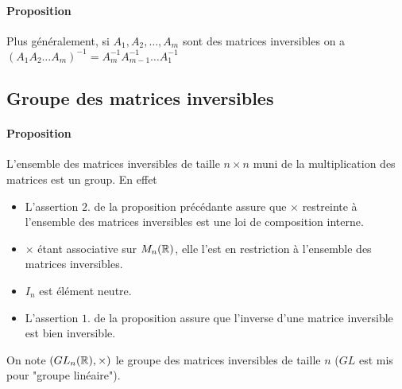 \paragraph{Proposition} Plus généralement, si $A_1, A_2, \ldots, A_m$ sont des matrices inversibles on a $(A_1 A_2 \ldots A_m)^{-1} = A_m^{-1} A_{m-1}^{-1} \ldots A_1^{-1}$

%
\subsection{Groupe des matrices inversibles}
%
\paragraph{Proposition} L'ensemble des matrices inversibles de taille $n \times n$ muni de la multiplication des matrices est un group. En effet
\begin{itemize}
  \item L'assertion $2.$ de la proposition précédante assure que $\times$ restreinte à l'ensemble des matrices inversibles est une loi de composition interne.
  \item $\times$ étant associative sur $M_{n}(\mathbb{R})$, elle l'est en restriction à l'ensemble des matrices inversibles.
  \item $I_n$ est élément neutre.
  \item L'assertion $1.$ de la proposition assure que l'inverse d'une matrice inversible est bien inversible.
\end{itemize}
On note $(GL_{n}(\mathbb{R}), \times)$ le groupe des matrices inversibles de taille $n$ ($GL$ est mis pour "groupe linéaire").


